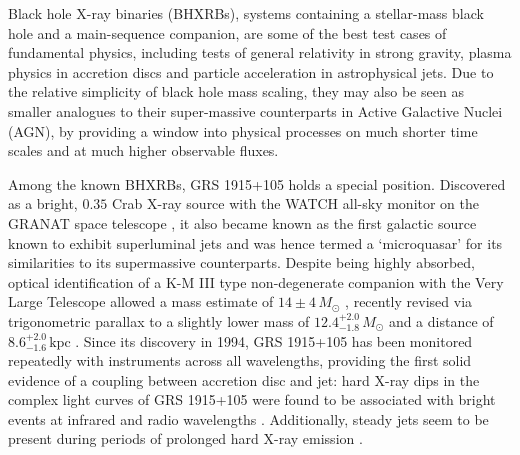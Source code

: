 \documentclass[12pt]{emulateapj}
\begin{document}
Black hole X-ray binaries (BHXRBs), systems containing a stellar-mass black hole and a main-sequence companion, are some of the best test cases of fundamental physics, including tests of general relativity in strong gravity, plasma physics in accretion discs and particle acceleration in astrophysical jets. 
Due to the relative simplicity of black hole mass scaling, they may also be seen as smaller analogues to their super-massive counterparts in Active Galactive Nuclei (AGN), by providing a window into physical processes on much shorter time scales and at much higher observable fluxes.

Among the known BHXRBs, GRS 1915+105 holds a special position. Discovered as a bright, $0.35$ Crab X-ray source \citep{castrotirado1994} with the WATCH all-sky monitor on the GRANAT space telescope \citep{castrotirado1992}, it also became known as the first galactic source known to exhibit superluminal jets \citep{mirabel1994, fender1999} and was hence termed a `microquasar' for its similarities to its supermassive counterparts. 
Despite being highly absorbed, optical identification of a K-M III type non-degenerate companion with the Very Large Telescope allowed a mass estimate of $14\pm 4\,M_\odot$ \citep{greiner2001}, recently revised via trigonometric parallax to a slightly lower mass of $12.4^{+2.0}_{-1.8}\, M_\odot$ and a distance of $8.6^{+2.0}_{-1.6}\,\mathrm{kpc}$ \citep{reid2014}. 
Since its discovery in 1994, GRS 1915+105 has been monitored repeatedly with instruments across all wavelengths, providing the first solid evidence of a coupling between accretion disc and jet: hard X-ray dips in the complex light curves of GRS 1915+105 were found to be associated with bright events at infrared and radio wavelengths \citep{pooley1997, eikenberry1998a, eikenberry1998b, kleinwolt2002}. Additionally, steady jets seem to be present during periods of prolonged hard X-ray emission \citep{foster1996, dhawan2000, fuchs2003}. 
\end{document}
